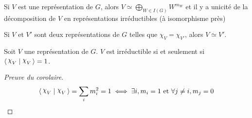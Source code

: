 \begin{cor}
    Si $V$ est une représentation de  $G$, alors  $V\simeq \bigoplus_{W \in  I(G)}W^{m_W}$ et il y a unicité de la décomposition de  $V$ en représentations irréductibles (à isomorphisme près)
\end{cor}

\begin{cor}
    Si $V$ et  $V'$ sont deux représentations de  $G$ telles que  $\chi_V=\chi_{V'}$, alors $V\simeq V'$.
\end{cor}

\begin{cor}
Soit $V$ une représentation de  $G$.  $V$ est irréductible  si et seulement si $\scalar{\chi_V}{\chi_V} =1$.
\end{cor}

\begin{proof}[Preuve du corolaire]
\[
    \scalar{\chi_V}{\chi_V} =\sum_i m_i^2=1 \iff  \exists  i, m_i=1\text{ et } \forall  j\neq i, m_j=0
\] 
\end{proof}
